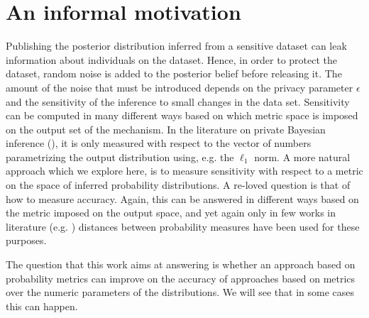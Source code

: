 \documentclass[sigconf]{acmart}
\begin{document}


\maketitle

\section{An informal motivation}
\label{sec_intro}
Publishing the posterior distribution inferred from a sensitive dataset can
leak information about individuals on the dataset.
Hence, in order to protect the dataset, random noise is added to the posterior belief before releasing it.
The amount of the noise that must be introduced
depends on the privacy parameter $\epsilon$ and the sensitivity of the inference to
small changes in the data set. 
Sensitivity can be computed in many different ways based on which metric space
is imposed on the output set of the mechanism. In the literature on private Bayesian
inference (\cite{zhang2016differential,xiao2012bayesian}), it is only measured with
respect to the vector of numbers parametrizing the output distribution using, e.g. the $\ell_1$ norm.
A more natural approach which we explore here, is to measure sensitivity with respect to a metric on the space of inferred probability distributions.
A re-loved question is that of how to measure accuracy. Again,
this can be answered in different ways based on the metric imposed on the output space, and yet again
only in few works in literature (e.g. \cite{zhang2016differential})
distances between probability measures have been used for these purposes.


The question that this work aims at answering is whether
an approach based on probability metrics can improve on the accuracy of approaches based on metrics over
the numeric parameters of the distributions. 
We will see that in some cases this can happen.
\end{document}
